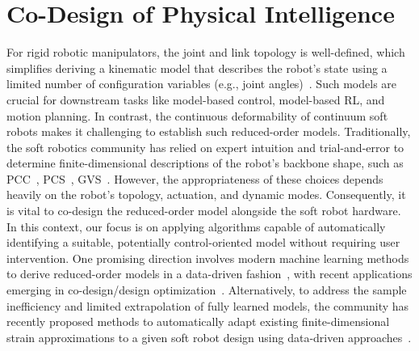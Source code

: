 \section{Co-Design of Physical Intelligence}\label{sec:apx:holisticcodesign:codesigning_physical_intelligence}
For rigid robotic manipulators, the joint and link topology is well-defined, which simplifies deriving a kinematic model that describes the robot’s state using a limited number of configuration variables (e.g., joint angles)~\citep{siciliano2010robotics, zhao2020robogrammar}. Such models are crucial for downstream tasks like model-based control, model-based RL, and motion planning. In contrast, the continuous deformability of continuum soft robots makes it challenging to establish such reduced-order models. Traditionally, the soft robotics community has relied on expert intuition and trial-and-error to determine finite-dimensional descriptions of the robot’s backbone shape, such as \gls{PCC}~\citep{webster2010design}, \gls{PCS}~\citep{renda2018discrete}, \gls{GVS}~\citep{renda2020geometric}. However, the appropriateness of these choices depends heavily on the robot’s topology, actuation, and dynamic modes. Consequently, it is vital to co-design the reduced-order model alongside the soft robot hardware. In this context, our focus is on applying algorithms capable of automatically identifying a suitable, potentially control-oriented model without requiring user intervention. One promising direction involves modern machine learning methods to derive reduced-order models in a data-driven fashion~\citep{thuruthel2017learning, bern2020soft, alora2023data, chen2024data, menager2023direct}, with recent applications emerging in co-design/design optimization~\citep{navez2024contributions}. Alternatively, to address the sample inefficiency and limited extrapolation of fully learned models, the community has recently proposed methods to automatically adapt existing finite-dimensional strain approximations to a given soft robot design using data-driven approaches~\citep{alkayas2025soft, valadas2025learning}.

